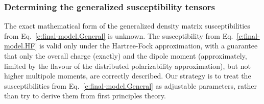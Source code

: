 \documentclass[aip,graphicx]{revtex4-1}
\begin{document}
\subsubsection{Determining the generalized susceptibility tensors}

The exact mathematical form of the generalized density matrix susceptibilities 
from Eq.~\eqref{e:final-model.General} is unknown. 
The susceptibility from Eq.~\eqref{e:final-model.HF} is valid only under the Hartree\hyp{}Fock
approximation, with a guarantee that only the overall charge (exactly) and the dipole moment (approximately,
limited by the flavour of the distributed polarizability approximation), 
but not higher multipole moments, are correctly described.
Our strategy is to treat the susceptibilities from Eq.~\eqref{e:final-model.General}
as adjustable parameters, rather than try to derive them from first principles theory.
\end{document}
